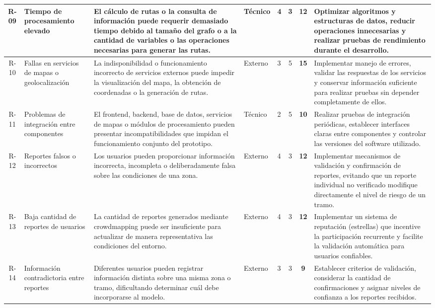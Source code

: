 \begin{landscape}
\begin{longtable}{|c|p{3cm}|p{5cm}|p{2cm}|p{1.1cm}|c|c|p{6cm}|}
R-09 & Tiempo de procesamiento elevado & El cálculo de rutas o la consulta de información puede requerir demasiado tiempo debido al tamaño del grafo o a la cantidad de variables o las operaciones necesarias para generar las rutas. & Técnico & 4 & 3 & \cellcolor{riskOrange} \textbf{12} & Optimizar algoritmos y estructuras de datos, reducir operaciones innecesarias y realizar pruebas de rendimiento durante el desarrollo. \\ \hline

R-10 & Fallas en servicios de mapas o geolocalización & La indisponibilidad o funcionamiento incorrecto de servicios externos puede impedir la visualización del mapa, la obtención de coordenadas o la generación de rutas. & Externo & 3 & 5 & \cellcolor{riskRed} \textbf{15} & Implementar manejo de errores, validar las respuestas de los servicios y conservar información suficiente para realizar pruebas sin depender completamente de ellos. \\ \hline

R-11 & Problemas de integración entre componentes & El frontend, backend, base de datos, servicios de mapas o módulos de procesamiento pueden presentar incompatibilidades que impidan el funcionamiento conjunto del prototipo. & Técnico & 2 & 5 & \cellcolor{riskOrange} \textbf{10} & Realizar pruebas de integración periódicas, establecer interfaces claras entre componentes y controlar las versiones del software utilizado. \\ \hline

R-12 & Reportes falsos o incorrectos & Los usuarios pueden proporcionar información incorrecta, incompleta o deliberadamente falsa sobre las condiciones de una zona. & Externo & 4 & 3 & \cellcolor{riskOrange} \textbf{12} & Implementar mecanismos de validación y confirmación de reportes, evitando que un reporte individual no verificado modifique directamente el nivel de riesgo de un tramo. \\ \hline

R-13 & Baja cantidad de reportes de usuarios & La cantidad de reportes generados mediante crowdmapping puede ser insuficiente para actualizar de manera representativa las condiciones del entorno. & Externo & 4 & 3 & \cellcolor{riskOrange} \textbf{12} & Implementar un sistema de reputación (estrellas) que incentive la participación recurrente y facilite la validación automática para usuarios confiables. \\ \hline

R-14 & Información contradictoria entre reportes & Diferentes usuarios pueden registrar información distinta sobre una misma zona o tramo, dificultando determinar cuál debe incorporarse al modelo. & Externo & 3 & 3 & \cellcolor{riskYellow} \textbf{9} & Establecer criterios de validación, considerar la cantidad de confirmaciones y asignar niveles de confianza a los reportes recibidos. \\ \hline


\end{longtable}
\end{landscape}
